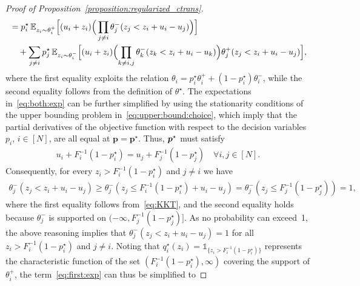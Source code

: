 \documentclass[11pt, a4paper, oneside, reqno]{article}
\begin{document}
\begin{proof}[Proof of Proposition~\ref{proposition:regularized_ctrans}]
\begin{subequations}
\begin{align}
        &= \displaystyle p_i^\star\, \mathbb{E}_{z_i \sim \theta_i^+} \Big[ (u_i + z_i) \Big( \prod_{j \neq i} \theta_j^-(z_j < z_i + u_i - u_j) \Big) \Big] \label{eq:first:exp}\\
        &\quad + \displaystyle \sum_{j \neq i} p_j^\star \,\mathbb{E}_{z_i \sim \theta_i^-} \Big[ (u_i + z_i) \Big( \!\prod_{k \neq i, j} \theta_k^-(z_k < z_i + u_i - u_k) \Big) \theta_j^+(z_j < z_i + u_i - u_j) \Big], \label{eq:second:exp}
    \end{align}
    \end{subequations}
    where the first equality exploits the relation $\theta_i = p_i^\star \theta_i^+ + (1 - p_i^\star) \theta_i^-$, while the second equality follows from the definition of $\theta^\star$. The expectations in~\eqref{eq:both:exp} can be further simplified by using the stationarity conditions of the upper bounding problem in~\eqref{eq:upper:bound:choice}, which imply that the partial derivatives of the objective function with respect to the decision variables $p_i$, $i\in[N]$, are all equal at $\bm p=\bm p^\star$. Thus, $\boldsymbol p^\star$ must satisfy
    \begin{align}
        \label{eq:KKT}
        u_i + F_i^{-1}(1 - p_i^\star) = u_j + F_j^{-1}(1 - p_j^\star) \quad \forall i, j \in [N].
    \end{align}
    Consequently, for every $z_i > F_i^{-1}(1 - p_i^\star)$ and $j\neq i$ we have
    \begin{align*}
        \theta_j^-(z_j < z_i + u_i - u_j) 
        \geq \theta_j^-(z_j \leq F_i^{-1}(1 - p_i^\star) + u_i - u_j)
        = \theta_j^-(z_j \leq F_j^{-1}(1 - p_j^\star)) = 1,
    \end{align*}
    where the first equality follows from~\eqref{eq:KKT}, and the second equality holds because $\theta_j^-$ is supported on $(-\infty, F_j^{-1}(1 - p_j^\star)]$. As no probability can exceed~1, the above reasoning implies that $\theta_j^-(z_j < z_i + u_i - u_j)=1$ for all $z_i > F_i^{-1}(1 - p_i^\star)$ and $j\neq i$. Noting that $q_i^\star(z_i)= \mathds{1}_{\{ z_i > F_i^{-1}(1 - p_i^\star) \}}$ represents the characteristic function of the set $(F_i^{-1}(1 - p_i^\star), \infty)$ covering the support of $\theta_i^+$, the term~\eqref{eq:first:exp} can thus be simplified to

\end{proof}
\end{document}
